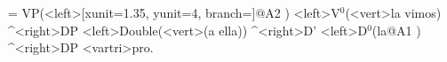 \begin{exe}
\ex\label{ex:authier:23}
\jtree[xunit=2,labelgap=0.2]
\! = {VP}(<left>[xunit=1.35, yunit=4, branch=\blank]{}@A2 )
    <left>{V$^{0}$}(<vert>{la vimos}) ^<right>{DP}
    <left>{Double}(<vert>{(a ella)}) ^<right>{D'}
    <left>{D$^{0}$}({la}@A1 ) ^<right>{DP} <vartri>{pro}.
\endjtree
{}
\end{exe}